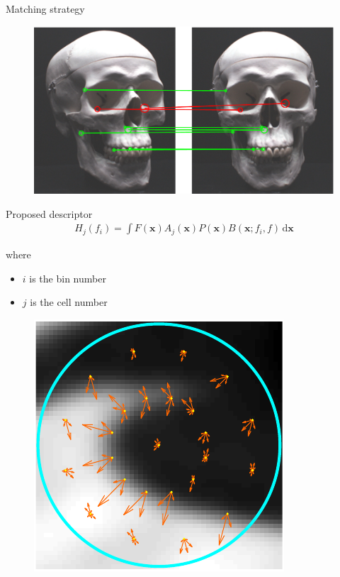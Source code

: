 \documentclass[14pt,t]{beamer}
\def\x{\mathbf{x}}
\begin{document}
\begin{frame}{Matching strategy}
\begin{figure}
\centering
	\includegraphics[width=\textwidth]{img/imageCorrespondenceExample3.pdf}
\end{figure}
\end{frame}
%
\begin{frame}{Proposed descriptor}
\begin{align*}
H_j(f_i) = \int F(\x) A_j (\x) P (\x) B(\x; f_i,f) \,\text{d} \x
\end{align*}
\begin{minipage}[t]{0.58\textwidth}
	where
	\begin{itemize}
	\item[] $i$ is the bin number
	\item[] $j$ is the cell number
	\end{itemize}
\end{minipage}
\begin{minipage}[t]{0.4\textwidth}
	\begin{figure}
		\includegraphics[width=\textwidth, clip=true, trim=1 1 1 1]{img/shoeDescriptorZoom.pdf}
	\end{figure}
\end{minipage}
\end{frame}
\end{document}
